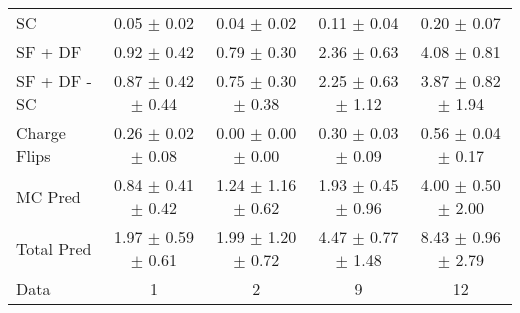 \begin{tabular}{l|cccc}
                                 SC &  0.05 $\pm$  0.02 &  0.04 $\pm$  0.02 &  0.11 $\pm$  0.04 &  0.20 $\pm$  0.07 \\
                            SF + DF &  0.92 $\pm$  0.42 &  0.79 $\pm$  0.30 &  2.36 $\pm$  0.63 &  4.08 $\pm$  0.81 \\
\hline
                       SF + DF - SC &  0.87 $\pm$  0.42 $\pm$  0.44 &  0.75 $\pm$  0.30 $\pm$  0.38 &  2.25 $\pm$  0.63 $\pm$  1.12 &  3.87 $\pm$  0.82 $\pm$  1.94 \\
\hline\hline
                       Charge Flips &  0.26 $\pm$  0.02 $\pm$  0.08 &  0.00 $\pm$  0.00 $\pm$  0.00 &  0.30 $\pm$  0.03 $\pm$  0.09 &  0.56 $\pm$  0.04 $\pm$  0.17 \\
\hline
                            MC Pred &  0.84 $\pm$  0.41 $\pm$  0.42 &  1.24 $\pm$  1.16 $\pm$  0.62 &  1.93 $\pm$  0.45 $\pm$  0.96 &  4.00 $\pm$  0.50 $\pm$  2.00 \\
\hline
                         Total Pred &  1.97 $\pm$  0.59 $\pm$  0.61 &  1.99 $\pm$  1.20 $\pm$  0.72 &  4.47 $\pm$  0.77 $\pm$  1.48 &  8.43 $\pm$  0.96 $\pm$  2.79 \\
\hline\hline
                               Data &     1 &     2 &     9 &    12 \\
\hline\hline
\end{tabular}

